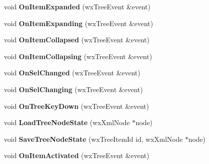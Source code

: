 \begin{DoxyCompactItemize}
\item 
\hypertarget{class_my_frame_a841f627cf18feb4f0cf0ed2f7a18e92f}{void {\bfseries On\+Item\+Expanded} (wx\+Tree\+Event \&event)}\label{class_my_frame_a841f627cf18feb4f0cf0ed2f7a18e92f}

\item 
\hypertarget{class_my_frame_a7792f94a81b3a2721ef6cfd324524163}{void {\bfseries On\+Item\+Expanding} (wx\+Tree\+Event \&event)}\label{class_my_frame_a7792f94a81b3a2721ef6cfd324524163}

\item 
\hypertarget{class_my_frame_aa9b2cd47741e163cb4552d3c62ce63e2}{void {\bfseries On\+Item\+Collapsed} (wx\+Tree\+Event \&event)}\label{class_my_frame_aa9b2cd47741e163cb4552d3c62ce63e2}

\item 
\hypertarget{class_my_frame_abd896103559532bed8617606b1447930}{void {\bfseries On\+Item\+Collapsing} (wx\+Tree\+Event \&event)}\label{class_my_frame_abd896103559532bed8617606b1447930}

\item 
\hypertarget{class_my_frame_a6ceb19e603278d7b199b314e7f02f688}{void {\bfseries On\+Sel\+Changed} (wx\+Tree\+Event \&event)}\label{class_my_frame_a6ceb19e603278d7b199b314e7f02f688}

\item 
\hypertarget{class_my_frame_a212cea1f4caf2a697b3d8cd1251e5f50}{void {\bfseries On\+Sel\+Changing} (wx\+Tree\+Event \&event)}\label{class_my_frame_a212cea1f4caf2a697b3d8cd1251e5f50}

\item 
\hypertarget{class_my_frame_aee792b87ae25ee2026f2a8244653c464}{void {\bfseries On\+Tree\+Key\+Down} (wx\+Tree\+Event \&event)}\label{class_my_frame_aee792b87ae25ee2026f2a8244653c464}

\item 
\hypertarget{class_my_frame_af3d1463d4a80d4ece133d1d38782fa31}{void {\bfseries Load\+Tree\+Node\+State} (wx\+Xml\+Node $\ast$node)}\label{class_my_frame_af3d1463d4a80d4ece133d1d38782fa31}

\item 
\hypertarget{class_my_frame_a3f8790bd2add4e8a7a3cbc40c3ce9f5c}{void {\bfseries Save\+Tree\+Node\+State} (wx\+Tree\+Item\+Id id, wx\+Xml\+Node $\ast$node)}\label{class_my_frame_a3f8790bd2add4e8a7a3cbc40c3ce9f5c}

\item 
\hypertarget{class_my_frame_a15e642068698359c0e78ce263169e661}{void {\bfseries On\+Item\+Activated} (wx\+Tree\+Event \&event)}\label{class_my_frame_a15e642068698359c0e78ce263169e661}


\end{DoxyCompactItemize}
